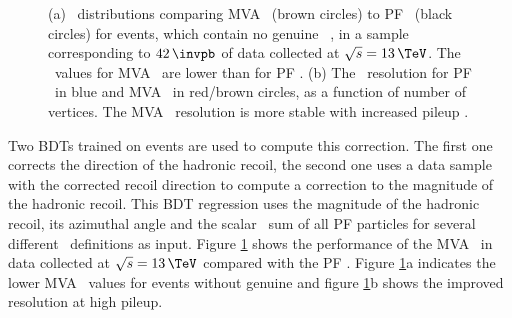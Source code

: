 \begin{figure}[h!]
\begin{center}
\end{center}
\caption[\MET~distributions comparing MVA \MET~to PF \MET~for
\Zmm events, in a sample corresponding to $42\,\invpb$ of data collected
at $\sqrt{s}=13\,\TeV$.]{(a) \MET~distributions comparing MVA \MET~(brown circles) to \ac{PF} \MET~(black circles) for
\Zmm events, which contain no genuine \MET~, in a sample corresponding to $42\,\invpb$ of data collected at $\sqrt{s}=13\,\TeV$. The 
\MET~values for MVA \MET~are lower than for \ac{PF} \MET. (b) The \MET~resolution for \ac{PF} \MET~in blue and MVA \MET~in red/brown
circles, as a function of number of vertices. The MVA \MET~resolution is more stable with increased pileup \cite{cms-dp-mvamet}.}
\label{fig:objects_mvamet}
\end{figure}

Two \acp{BDT} trained on \Zmm events are used to compute this correction.
The first one corrects the direction of the hadronic recoil, the second
one uses a data sample with the corrected recoil direction to compute a correction
to the magnitude of the hadronic recoil. This \ac{BDT} regression uses the magnitude of the hadronic
recoil, its azimuthal angle and the scalar \pT~sum of all \ac{PF} particles for several 
different \MET~definitions \cite{cms-met-run1} as input. Figure \ref{fig:objects_mvamet} shows
the performance of the MVA \MET~in data collected at $\sqrt{s}=13\,\TeV$ compared with 
the \ac{PF} \MET. Figure \ref{fig:objects_mvamet}a indicates the lower MVA \MET~values for events without genuine
\MET and figure \ref{fig:objects_mvamet}b shows the improved resolution at high pileup.

